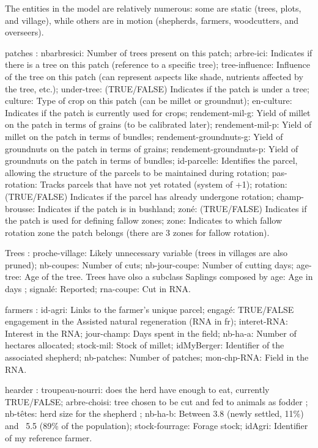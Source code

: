\documentclass{article}
\begin{document}
        The entities in the model are relatively numerous: some are static (trees, plots, and village), while others are in motion (shepherds, farmers, woodcutters, and overseers). 

        patches : nbarbresici: Number of trees present on this patch; arbre-ici: Indicates if there is a tree on this patch (reference to a specific tree); tree-influence: Influence of the tree on this patch (can represent aspects like shade, nutrients affected by the tree, etc.); under-tree: (TRUE/FALSE) Indicates if the patch is under a tree; culture: Type of crop on this patch (can be millet or groundnut); en-culture: Indicates if the patch is currently used for crops; rendement-mil-g: Yield of millet on the patch in terms of grains (to be calibrated later); rendement-mil-p: Yield of millet on the patch in terms of bundles; rendement-groundnuts-g: Yield of groundnuts on the patch in terms of grains; rendement-groundnuts-p: Yield of groundnuts on the patch in terms of bundles; id-parcelle: Identifies the parcel, allowing the structure of the parcels to be maintained during rotation; pas-rotation: Tracks parcels that have not yet rotated (system of +1); rotation: (TRUE/FALSE) Indicates if the parcel has already undergone rotation; champ-brousse: Indicates if the patch is in bushland; zoné: (TRUE/FALSE) Indicates if the patch is used for defining fallow zones; zone: Indicates to which fallow rotation zone the patch belongs (there are 3 zones for fallow rotation).

        Trees : proche-village: Likely unnecessary variable (trees in villages are also pruned); nb-coupes: Number of cuts; nb-jour-coupe: Number of cutting days; age-tree: Age of the tree. Trees have olso a subclass Saplings composed by age: Age in days ; signalé: Reported; rna-coupe: Cut in RNA.


        farmers : id-agri: Links to the farmer's unique parcel; engagé: TRUE/FALSE engagement in the Assisted natural regeneration (RNA in fr); interet-RNA: Interest in the RNA; jour-champ: Days spent in the field; nb-ha-a: Number of hectares allocated; stock-mil: Stock of millet; idMyBerger: Identifier of the associated shepherd; nb-patches: Number of patches; mon-chp-RNA: Field in the RNA.


        hearder : troupeau-nourri: does the herd have enough to eat, currently TRUE/FALSE; arbre-choisi: tree chosen to be cut and fed to animals as fodder ; nb-têtes: herd size for the shepherd ; nb-ha-b: Between 3.8 (newly settled, 11\%) and ~5.5 (89\% of the population); stock-fourrage: Forage stock; idAgri: Identifier of my reference farmer.
\end{document}
